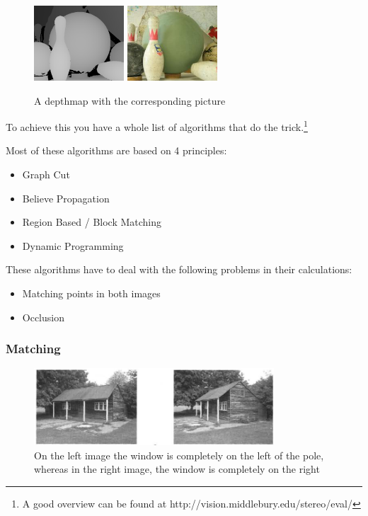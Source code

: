 \documentclass[a4paper]{article}
\begin{document}
\begin{figure} \centering
\includegraphics[width=0.3\textwidth]{depthmap}
\includegraphics[width=0.3\textwidth]{depthmap_original}
\caption{A depthmap with the corresponding picture}
\end{figure}

To achieve this you have a whole list of algorithms that do the
trick.\footnote{A good overview can be found at
http://vision.middlebury.edu/stereo/eval/}

Most of these algorithms are based on 4 principles:

\begin{itemize}
\item Graph Cut
\item Believe Propagation
\item Region Based / Block Matching
\item Dynamic Programming
\end{itemize}

These algorithms have to deal with the following problems in their
calculations:

\begin{itemize}
    \item Matching points in both images
    \item Occlusion
\end{itemize}


\subsubsection{Matching} 


\begin{figure} [h!tb]
\centering
\includegraphics[width=0.8\textwidth]{matching_problems_direction}
\caption{On the left image the window is completely on the left of the
pole, whereas in the right image, the window is completely on the
right}
\label{dirprob}
\end{figure}
\end{document}
